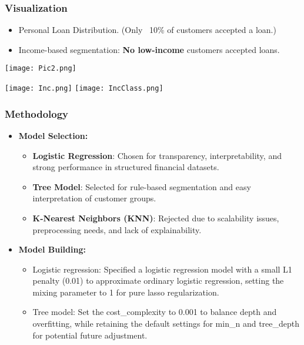 \documentclass{beamer}
\begin{document}
\begin{frame}
\frametitle{Visualization}
\begin{itemize}
  \item Personal Loan Distribution. (Only ~10\% of customers accepted a loan.)
  \item Income-based segmentation: \textbf{No low-income} customers accepted loans.
\end{itemize}
\vspace{0.3cm}
\begin{minipage}{0.5\textwidth}
    \texttt{[image: Pic2.png]}
\end{minipage}%
\begin{minipage}{0.5\textwidth}
    \texttt{[image: Inc.png]}
    \texttt{[image: IncClass.png]}
\end{minipage}
\end{frame}


\begin{frame}
\frametitle{Methodology}
\begin{itemize}
  \item \textbf{Model Selection:}
  \begin{itemize}
    \item \textbf{Logistic Regression}: Chosen for transparency, interpretability, and strong performance in structured financial datasets.
    \item \textbf{Tree Model}: Selected for rule-based segmentation and easy interpretation of customer groups.
    \item \textbf{K-Nearest Neighbors (KNN)}: Rejected due to scalability issues, preprocessing needs, and lack of explainability.
  \end{itemize}
  \item \textbf{Model Building:}
  \begin{itemize}
    \item Logistic regression: Specified a logistic regression model with a small L1 penalty (0.01) to approximate ordinary logistic regression, setting the mixing parameter to 1 for pure lasso regularization.
    \item Tree model: Set the cost\_complexity to 0.001 to balance depth and overfitting, while retaining the default settings for min\_n and tree\_depth for potential future adjustment.
  \end{itemize}
\end{itemize}
\end{frame}
\end{document}
